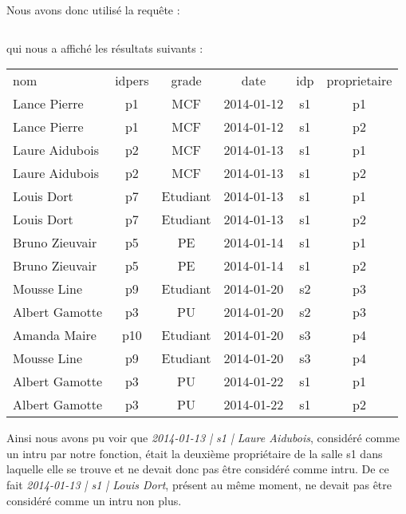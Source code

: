 Nous avons donc utilisé la requête :
\inputminted[tabsize=4,linenos,fontsize=\small]{sql}{code/2.sql}

qui nous a affiché les résultats suivants :

\begin{center}
	\begin{tabular}
		{| l |	c |	c | c | c | c |} \hline
		nom       & idpers &  grade   &    date    & idp & proprietaire \\ \hlineGras
		 Lance Pierre   & p1      & MCF      & 2014-01-12 & s1  & p1 \\ \hline
		 Lance Pierre   & p1     & MCF      & 2014-01-12 & s1  & p2 \\ \hline
		 Laure Aidubois & p2     & MCF      & 2014-01-13 & s1  & p1 \\ \hline 
		 Laure Aidubois & p2     & MCF      & 2014-01-13 & s1  & p2 \\ \hline
		 Louis Dort     & p7     & Etudiant & 2014-01-13 & s1  & p1 \\ \hline
		 Louis Dort     & p7     & Etudiant & 2014-01-13 & s1  & p2 \\ \hline
		 Bruno Zieuvair & p5     & PE       & 2014-01-14 & s1  & p1 \\ \hline
		 Bruno Zieuvair & p5     & PE       & 2014-01-14 & s1  & p2 \\ \hline
		 Mousse Line    & p9     & Etudiant & 2014-01-20 & s2  & p3 \\ \hline
		 Albert Gamotte & p3     & PU       & 2014-01-20 & s2  & p3 \\ \hline
		 Amanda Maire   & p10    & Etudiant & 2014-01-20 & s3  & p4 \\ \hline
		 Mousse Line    & p9     & Etudiant & 2014-01-20 & s3  & p4 \\ \hline
		 Albert Gamotte & p3     & PU       & 2014-01-22 & s1  & p1 \\ \hline
		 Albert Gamotte & p3     & PU       & 2014-01-22 & s1  & p2 \\ \hline
	\end{tabular}
\end{center}

Ainsi nous avons pu voir que \textit{2014-01-13 | s1 | Laure Aidubois}, considéré comme un intru par notre fonction, était la deuxième propriétaire de la salle s1 dans laquelle elle se trouve et ne devait donc pas être considéré comme intru. De ce fait \textit{2014-01-13 | s1 | Louis Dort}, présent au même moment, ne devait pas être considéré comme un intru non plus.

